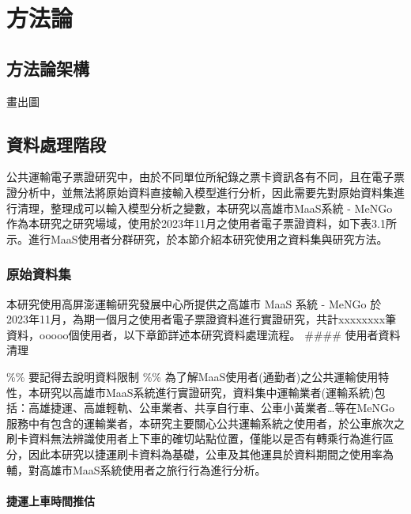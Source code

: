 
\providecommand{\tightlist}{%
  \setlength{\itemsep}{0pt}\setlength{\parskip}{0pt}
}

\chapter{方法論}\label{ux65b9ux6cd5ux8ad6}

\section{方法論架構}\label{ux65b9ux6cd5ux8ad6ux67b6ux69cb}

畫出圖

\section{資料處理階段}\label{ux8cc7ux6599ux8655ux7406ux968eux6bb5}

公共運輸電子票證研究中，由於不同單位所紀錄之票卡資訊各有不同，且在電子票證分析中，並無法將原始資料直接輸入模型進行分析，因此需要先對原始資料集進行清理，整理成可以輸入模型分析之變數，本研究以高雄市MaaS系統
- MeNGo
作為本研究之研究場域，使用於2023年11月之使用者電子票證資料，如下表3.1所示。進行MaaS使用者分群研究，於本節介紹本研究使用之資料集與研究方法。

\subsection{原始資料集}\label{ux539fux59cbux8cc7ux6599ux96c6}

本研究使用高屏澎運輸研究發展中心所提供之高雄市 MaaS 系統 - MeNGo 於
2023年11月，為期一個月之使用者電子票證資料進行實證研究，共計xxxxxxxx筆資料，ooooo個使用者，以下章節詳述本研究資料處理流程。
\#\#\#\# 使用者資料清理

\%\% 要記得去說明資料限制 \%\%
為了解MaaS使用者(通勤者)之公共運輸使用特性，本研究以高雄市MaaS系統進行實證研究，資料集中運輸業者(運輸系統)包括：高雄捷運、高雄輕軌、公車業者、共享自行車、公車小黃業者\ldots 等在MeNGo服務中有包含的運輸業者，本研究主要關心公共運輸系統之使用者，於公車旅次之刷卡資料無法辨識使用者上下車的確切站點位置，僅能以是否有轉乘行為進行區分，因此本研究以捷運刷卡資料為基礎，公車及其他運具於資料期間之使用率為輔，對高雄市MaaS系統使用者之旅行行為進行分析。

\subsubsection{捷運上車時間推估}\label{ux6377ux904bux4e0aux8ecaux6642ux9593ux63a8ux4f30}


